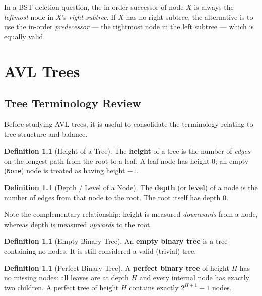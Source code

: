 \documentclass[11pt, a4paper, notitlepage]{report}
\theoremstyle{definition}
\newtheorem{definition}[theorem]{Definition}
\theoremstyle{remark}
\theoremstyle{definition}
\begin{document}
\begin{examtip}[title={Exam Tip: Identifying the Successor Quickly}]
In a BST deletion question, the in-order successor of node $X$ is always the
\emph{leftmost} node in $X$'s \emph{right subtree}.  If $X$ has no right subtree,
the alternative is to use the in-order \emph{predecessor} --- the rightmost node in the
left subtree --- which is equally valid.
\end{examtip}


\chapter{AVL Trees}
\label{ch:avl-trees}

\section{Tree Terminology Review}
\label{sec:avl-terminology}

Before studying AVL trees, it is useful to consolidate the terminology relating to tree
structure and balance.

\begin{definition}[Height of a Tree]
\label{def:avl-height}
The \textbf{height} of a tree is the number of \emph{edges} on the longest path from the
root to a leaf.  A leaf node has height 0; an empty (\texttt{None}) node is treated as
having height $-1$.
\end{definition}

\begin{definition}[Depth / Level of a Node]
\label{def:avl-depth}
The \textbf{depth} (or \textbf{level}) of a node is the number of edges from that node to
the root.  The root itself has depth 0.
\end{definition}

Note the complementary relationship: height is measured \emph{downwards} from a node,
whereas depth is measured \emph{upwards} to the root.

\begin{definition}[Empty Binary Tree]
\label{def:empty-tree}
An \textbf{empty binary tree} is a tree containing no nodes.  It is still considered a
valid (trivial) tree.
\end{definition}

\begin{definition}[Perfect Binary Tree]
\label{def:perfect-tree}
A \textbf{perfect binary tree} of height $H$ has no missing nodes: all leaves are at
depth $H$ and every internal node has exactly two children.  A perfect tree of height $H$
contains exactly $2^{H+1} - 1$ nodes.
\end{definition}
\end{document}
